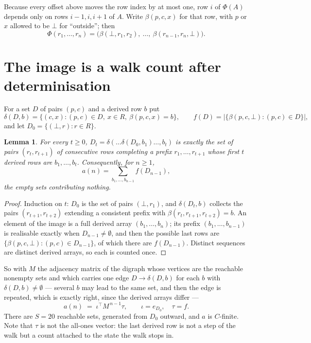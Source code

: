 \documentclass[11pt,a4paper]{article}
\theoremstyle{plain}
\newtheorem{lemma}[theorem]{Lemma}
\theoremstyle{definition}
\begin{document}
Because every offset above moves the row index by at most one, row $i$ of
$\Phi(A)$ depends only on rows $i-1,i,i+1$ of $A$. Write $\beta(p,c,x)$ for that row, with $p$
or $x$ allowed to be $\bot$ for ``outside''; then
\[
\Phi(r_1,\dots,r_n)=\bigl(\beta(\bot,r_1,r_2),\ \dots,\ \beta(r_{n-1},r_n,\bot)\bigr).
\]

\section{The image is a walk count after determinisation}

For a set $D$ of pairs $(p,c)$ and a derived row $b$ put
\[
\delta(D,b)=\{(c,x):(p,c)\in D,\ x\in R,\ \beta(p,c,x)=b\},\qquad
f(D)=\bigl|\{\beta(p,c,\bot):(p,c)\in D\}\bigr| ,
\]
and let $D_0=\{(\bot,r):r\in R\}$.

\begin{lemma}\label{lem:det}
For every $t\ge0$, $D_t=\delta(\dots\delta(D_0,b_1)\dots,b_t)$ is exactly the set of pairs
$(r_t,r_{t+1})$ of consecutive rows completing a prefix $r_1,\dots,r_{t+1}$ whose first $t$
derived rows are $b_1,\dots,b_t$. Consequently, for $n\ge1$,
\[
a(n)=\sum_{b_1,\dots,b_{n-1}}f(D_{n-1}),
\]
the empty sets contributing nothing.
\end{lemma}

\begin{proof}
Induction on $t$: $D_0$ is the set of pairs $(\bot,r_1)$, and $\delta(D_t,b)$ collects the
pairs $(r_{t+1},r_{t+2})$ extending a consistent prefix with
$\beta(r_t,r_{t+1},r_{t+2})=b$. An element of the image is a full derived array
$(b_1,\dots,b_n)$; its prefix $(b_1,\dots,b_{n-1})$ is realisable exactly when
$D_{n-1}\neq\emptyset$, and then the possible last rows are
$\{\beta(p,c,\bot):(p,c)\in D_{n-1}\}$, of which there are $f(D_{n-1})$. Distinct sequences
are distinct derived arrays, so each is counted once.
\end{proof}

So with $M$ the adjacency matrix of the digraph whose vertices are the reachable nonempty sets
and which carries one edge $D\to\delta(D,b)$ for each $b$ with $\delta(D,b)\neq\emptyset$ ---
several $b$ may lead to the same set, and then the edge is repeated, which is exactly right,
since the derived arrays differ ---
\[
a(n)\;=\;\iota^{\!\top}M^{\,n-1}\tau,\qquad \iota=e_{D_0},\quad \tau=f .
\]
There are $S=20$ reachable sets, generated from $D_0$ outward, and $a$ is $C$-finite.
Note that $\tau$ is not the all-ones vector: the last derived row is not a
step of the walk but a count attached to the state the walk stops in.
\end{document}
